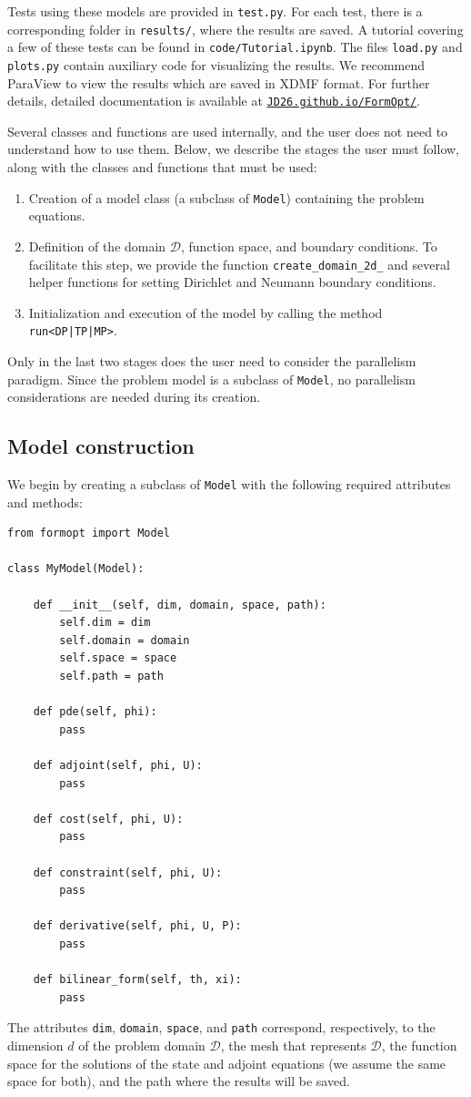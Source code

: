 \documentclass[iicol,pdflatex,sn-mathphys-ay]{sn-jnl}%
\theoremstyle{thmstyleone}%
\theoremstyle{thmstyletwo}%
\theoremstyle{thmstylethree}%
\begin{document}
Tests using these models are provided in \texttt{test.py}.
For each test, there is a corresponding folder in \texttt{results/},
where the results are saved. 
A tutorial covering a few of these tests can be found in
\texttt{code/Tutorial.ipynb}.
The files \texttt{load.py} and \texttt{plots.py} contain auxiliary code
for visualizing the results. 
We recommend ParaView \cite{10.5555/2789330}
to view the results which are saved in XDMF format. 
For further details,
detailed documentation is available at
\href{https://JD26.github.io/FormOpt/}{\texttt{JD26.github.io/FormOpt/}}.

Several classes and functions are used internally,
and the user does not need to understand how to use them.
Below, we describe the stages the user must follow,
along with the classes and functions that must be used:
\begin{enumerate}
\item Creation of a model class (a subclass of \texttt{Model})
	containing the problem equations. 
\item Definition of the domain $\mathcal{D}$, function space,
	and boundary conditions. To facilitate this step, we provide the function
	\texttt{create\_domain\_2d\_<DP|TP|MP>} and several helper functions
	for setting Dirichlet and Neumann boundary conditions. 
\item Initialization and execution of the model
	by calling the method \texttt{run<DP|TP|MP>}.
\end{enumerate}
Only in the last two stages does the user need to consider
the parallelism paradigm.
Since the problem model is a subclass of \texttt{Model},
no parallelism considerations are needed during its creation.


\subsection{Model construction}\label{sub:model}

We begin by creating a subclass of \texttt{Model} with the following
required attributes and methods:
\begin{lstlisting}
from formopt import Model

class MyModel(Model):

    def __init__(self, dim, domain, space, path):
        self.dim = dim
        self.domain = domain
        self.space = space
        self.path = path

	def pde(self, phi):
		pass
	
	def adjoint(self, phi, U):
		pass

	def cost(self, phi, U):
		pass
	
    def constraint(self, phi, U):
		pass

	def derivative(self, phi, U, P):
	 	pass
	
	def bilinear_form(self, th, xi):
		pass
\end{lstlisting}
The attributes \texttt{dim}, \texttt{domain}, \texttt{space}, and \texttt{path}
correspond, respectively, to the dimension $d$ of the problem
domain $\mathcal{D}$, the mesh that represents $\mathcal{D}$,
the function space for the solutions of the state and adjoint equations
(we assume the same space for both),
and the path where the results will be saved. 
\end{document}
